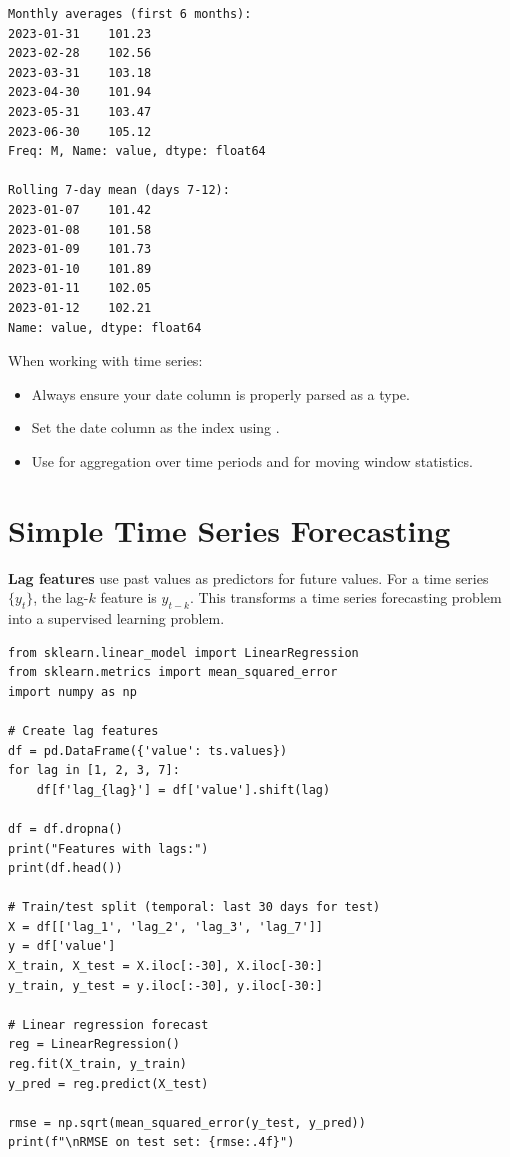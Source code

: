 \begin{codeoutput}
\begin{verbatim}
Monthly averages (first 6 months):
2023-01-31    101.23
2023-02-28    102.56
2023-03-31    103.18
2023-04-30    101.94
2023-05-31    103.47
2023-06-30    105.12
Freq: M, Name: value, dtype: float64

Rolling 7-day mean (days 7-12):
2023-01-07    101.42
2023-01-08    101.58
2023-01-09    101.73
2023-01-10    101.89
2023-01-11    102.05
2023-01-12    102.21
Name: value, dtype: float64
\end{verbatim}
\end{codeoutput}

\begin{bestpractice}
When working with time series:
\begin{itemize}
    \item Always ensure your date column is properly parsed as a  type.
    \item Set the date column as the index using .
    \item Use  for aggregation over time periods and  for moving window statistics.
\end{itemize}
\end{bestpractice}

\section{Simple Time Series Forecasting}
\label{sec:forecasting}


\begin{definition}
\textbf{Lag features} use past values as predictors for future values. For a time series $\{y_t\}$, the lag-$k$ feature is $y_{t-k}$. This transforms a time series forecasting problem into a supervised learning problem.
\end{definition}

\begin{codeblock}[title=\textbf{Python}]
\begin{verbatim}
from sklearn.linear_model import LinearRegression
from sklearn.metrics import mean_squared_error
import numpy as np

# Create lag features
df = pd.DataFrame({'value': ts.values})
for lag in [1, 2, 3, 7]:
    df[f'lag_{lag}'] = df['value'].shift(lag)

df = df.dropna()
print("Features with lags:")
print(df.head())

# Train/test split (temporal: last 30 days for test)
X = df[['lag_1', 'lag_2', 'lag_3', 'lag_7']]
y = df['value']
X_train, X_test = X.iloc[:-30], X.iloc[-30:]
y_train, y_test = y.iloc[:-30], y.iloc[-30:]

# Linear regression forecast
reg = LinearRegression()
reg.fit(X_train, y_train)
y_pred = reg.predict(X_test)

rmse = np.sqrt(mean_squared_error(y_test, y_pred))
print(f"\nRMSE on test set: {rmse:.4f}")
\end{verbatim}
\end{codeblock}

